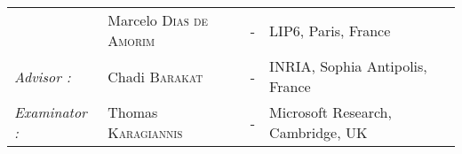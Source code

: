 \begin{titlepage}
\begin{center}
\begin{tabular}{llcl}
                        	& Marcelo \textsc{Dias de Amorim}		& - & LIP6, Paris, France\\
      \textit{Advisor :}	& Chadi \textsc{Barakat}	& - & INRIA, Sophia Antipolis, France\\
           \textit{Examinator :}   & Thomas \textsc{Karagiannis} & - & Microsoft Research, Cambridge, UK\\
\end{tabular}
\end{center}
\end{titlepage}
\sloppy

\titlepage
